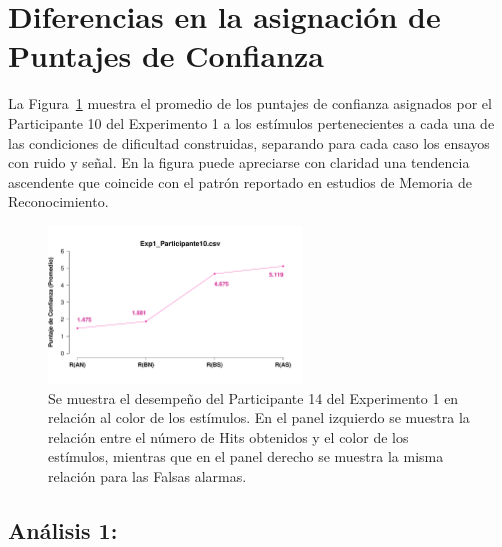\section{Diferencias en la asignación de Puntajes de Confianza}


La Figura~\ref{fig:MirrorRating_E1_P10} muestra el promedio de los puntajes de confianza asignados por el Participante 10 del Experimento 1 a los estímulos pertenecientes a cada una de las condiciones de dificultad construidas, separando para cada caso los ensayos con ruido y señal. En la figura puede apreciarse con claridad una tendencia ascendente que coincide con el patrón reportado en estudios de Memoria de Reconocimiento.\\

\begin{figure}[th]
\centering
\includegraphics[width=0.60\textwidth]{Figures/MirrorRating_Exp1_P10}
\caption[Comparación entre Puntajes de Confianza asignados por Condición; Ejemplo]{Se muestra el desempeño del Participante 14 del Experimento 1 en relación al color de los estímulos. En el panel izquierdo se muestra la relación entre el número de Hits obtenidos y el color de los estímulos, mientras que en el panel derecho se muestra la misma relación para las Falsas alarmas.}
\label{fig:MirrorRating_E1_P10}
\end{figure}






\subsection{Análisis 1: }

